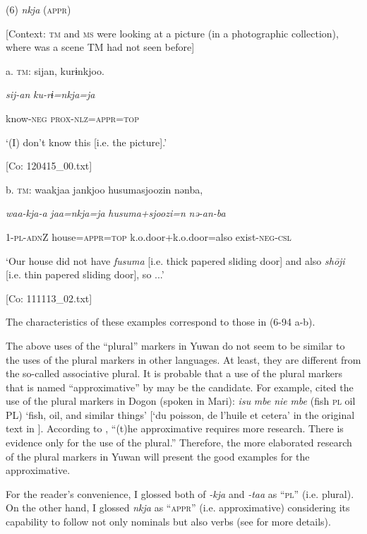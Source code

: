 (6)  \textit{nkja} (\textsc{appr})

  [Context: \textsc{tm} and \textsc{ms} were looking at a picture (in a photographic collection), where was a scene TM had not seen before]

  a.  \textsc{tm}:  sijan,  kurɨnkjoo.

      \textit{sij-an}  \textit{ku-rɨ=nkja=ja}

      know-\textsc{neg}  \textsc{prox}-\textsc{nlz}=\textsc{appr}=\textsc{top}

      ‘(I) don’t know this [i.e. the picture].’

      [Co: 120415\_00.txt]

  b.  \textsc{tm}:  waakjaa  jankjoo  {\textbar}husumasjoozi{\textbar}n  nənba,

      \textit{waa-kja-a}  \textit{jaa=nkja=ja}  \textit{husuma+sjoozi=n}  \textit{nə-an-ba}

      1-\textsc{pl}-\textsc{adn}Z  house=\textsc{appr}=\textsc{top}  k.o.door+k.o.door=also  exist-\textsc{neg}-\textsc{csl}

      ‘Our house did not have \textit{fusuma} [i.e. thick papered sliding door] and also \textit{shōji} [i.e. thin papered sliding door], so ...’

      [Co: 111113\_02.txt]

The characteristics of these examples correspond to those in (6-94 a-b).

  The above uses of the “plural” markers in Yuwan do not seem to be similar to the uses of the plural markers in other languages. At least, they are different from the so-called associative plural. It is probable that a use of the plural markers that is named “approximative” by \citet[239-240]{Corbett2000} may be the candidate. For example, \citet[239]{Corbett2000} cited the use of the plural markers in Dogon (spoken in Mari): \textit{isu} \textit{mbe} \textit{nie} \textit{mbe} (fish \textsc{pl} oil PL) ‘fish, oil, and similar things’ [‘du poisson, de l’huile et cetera’ in the original text in \citet[11]{Plungian1995}]. According to \citet[240]{Corbett2000}, “(t)he approximative requires more research. There is evidence only for the use of the plural.” Therefore, the more elaborated research of the plural markers in Yuwan will present the good examples for the approximative.

  For the reader’s convenience, I glossed both of \textit{{}-kja} and \textit{{}-taa} as “\textsc{pl}” (i.e. plural). On the other hand, I glossed \textit{nkja} as “\textsc{appr}” (i.e. approximative) considering its capability to follow not only nominals but also verbs (see  for more details).

